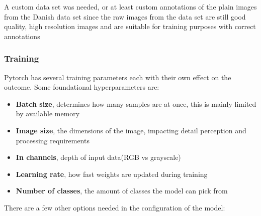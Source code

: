 \documentclass[final]{cmpreport_02}
\begin{document}
A custom data set was needed, or at least custom annotations of the plain images from the Danish data set since the raw images from the data set are still good quality, high resolution images and are suitable for training purposes with correct annotations
\subsubsection{Training}
Pytorch has several training parameters each with their own effect on the outcome. Some foundational hyperparameters are:

\begin{itemize}
	\item{\textbf{Batch size}, determines how many samples are at once, this is mainly limited by available memory}
	\item{\textbf{Image size}, the dimensions of the image, impacting detail perception and processing requirements}
	\item{\textbf{In channels}, depth of input data(RGB vs grayscale)}
	\item{\textbf{Learning rate}, how fast weights are updated during training}
	\item{\textbf{Number of classes}, the amount of classes the model can pick from}
\end{itemize}
There are a few other options needed in the configuration of the model:


\end{document}
